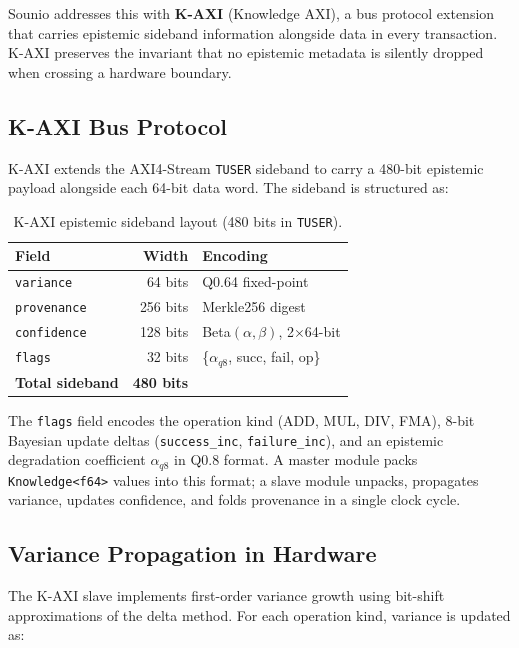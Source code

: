 \documentclass[journal]{IEEEtran}
\begin{document}
Sounio addresses this with \textbf{K-AXI} (Knowledge AXI), a bus protocol
extension that carries epistemic sideband information alongside data in
every transaction. K-AXI preserves the invariant that no epistemic metadata
is silently dropped when crossing a hardware boundary.

\subsection{K-AXI Bus Protocol}

K-AXI extends the AXI4-Stream \texttt{TUSER} sideband to carry a 480-bit
epistemic payload alongside each 64-bit data word. The sideband is
structured as:

\begin{table}[!t]
\caption{K-AXI epistemic sideband layout (480 bits in \texttt{TUSER}).}
\label{tab:kaxi-sideband}
\centering
\footnotesize
\begin{tabular}{lrl}
\toprule
Field & Width & Encoding \\
\midrule
\texttt{variance} & 64 bits & Q0.64 fixed-point \\
\texttt{provenance} & 256 bits & Merkle256 digest \\
\texttt{confidence} & 128 bits & Beta$(\alpha, \beta)$, 2$\times$64-bit \\
\texttt{flags} & 32 bits & \{$\alpha_{q8}$, succ, fail, op\} \\
\midrule
\textbf{Total sideband} & \textbf{480 bits} & \\
\bottomrule
\end{tabular}
\end{table}

The \texttt{flags} field encodes the operation kind (ADD, MUL, DIV, FMA),
8-bit Bayesian update deltas (\texttt{success\_inc}, \texttt{failure\_inc}),
and an epistemic degradation coefficient $\alpha_{q8}$ in Q0.8 format.
A master module packs \texttt{Knowledge<f64>} values into this format; a
slave module unpacks, propagates variance, updates confidence, and folds
provenance in a single clock cycle.

\subsection{Variance Propagation in Hardware}

The K-AXI slave implements first-order variance growth using bit-shift
approximations of the delta method. For each operation kind, variance is
updated as:
\end{document}
